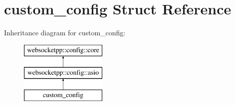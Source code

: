 \hypertarget{structcustom__config}{}\section{custom\+\_\+config Struct Reference}
\label{structcustom__config}
Inheritance diagram for custom\+\_\+config\+:\begin{figure}[H]
\begin{center}
\leavevmode
\includegraphics[height=3.000000cm]{structcustom__config}
\end{center}
\end{figure}
